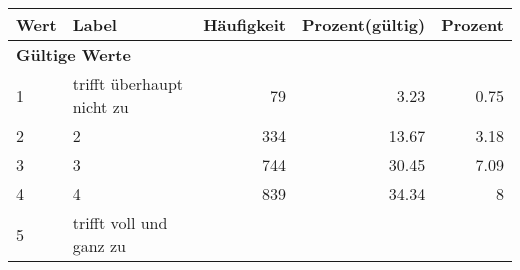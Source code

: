      \begin{longtable}{lXrrr}
     \toprule
     \textbf{Wert} & \textbf{Label} & \textbf{Häufigkeit} & \textbf{Prozent(gültig)} & \textbf{Prozent} \\
     \endhead
     \midrule
     \multicolumn{5}{l}{\textbf{Gültige Werte}}\\

     1 &
     \multicolumn{1}{X}{ trifft überhaupt nicht zu   } &


       \num{79} &
       \num[round-mode=places,round-precision=2]{3.23} &
         \num[round-mode=places,round-precision=2]{0.75} \\

     2 &
     \multicolumn{1}{X}{ 2   } &


       \num{334} &
       \num[round-mode=places,round-precision=2]{13.67} &
         \num[round-mode=places,round-precision=2]{3.18} \\

     3 &
     \multicolumn{1}{X}{ 3   } &


       \num{744} &
       \num[round-mode=places,round-precision=2]{30.45} &
         \num[round-mode=places,round-precision=2]{7.09} \\

     4 &
     \multicolumn{1}{X}{ 4   } &


       \num{839} &
       \num[round-mode=places,round-precision=2]{34.34} &
         \num[round-mode=places,round-precision=2]{8} \\

     5 &
     \multicolumn{1}{X}{ trifft voll und ganz zu   } &



\end{longtable}
